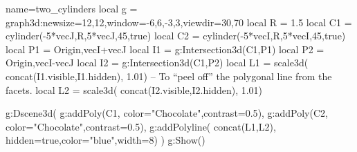 \documentclass[12pt]{standalone}
\begin{document}
\begin{luadraw}{name=two_cylinders}
local g = graph3d:new{size={12,12},window={-6,6,-3,3},viewdir={30,70}}
local R = 1.5
local C1 = cylinder(-5*vecJ,R,5*vecJ,45,true)
local C2 = cylinder(-5*vecI,R,5*vecI,45,true)
local P1 = {Origin,vecI+vecJ}
local I1 = g:Intersection3d(C1,P1)
local P2 = {Origin,vecI-vecJ}
local I2 = g:Intersection3d(C1,P2)
local L1 = scale3d( concat(I1.visible,I1.hidden), 1.01) -- To “peel off” the polygonal line from the facets.
local L2 = scale3d( concat(I2.visible,I2.hidden), 1.01)

g:Dscene3d(
    g:addPoly(C1, {color="Chocolate",contrast=0.5}),
    g:addPoly(C2, {color="Chocolate",contrast=0.5}),
    g:addPolyline( concat(L1,L2), {hidden=true,color="blue",width=8})
    )
g:Show()
\end{luadraw} 
\end{document}

